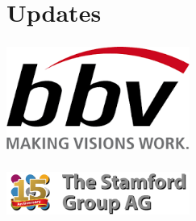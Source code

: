 \section{Updates}
\begin{frame}
  \frametitle{}
  \begin{center}
      \includegraphics[width=6cm]{images/bbv}
  \end{center}
\end{frame}
\begin{frame}
  \frametitle{}
  \begin{center}
      \includegraphics[width=6cm]{images/stamford}
  \end{center}
\end{frame}
